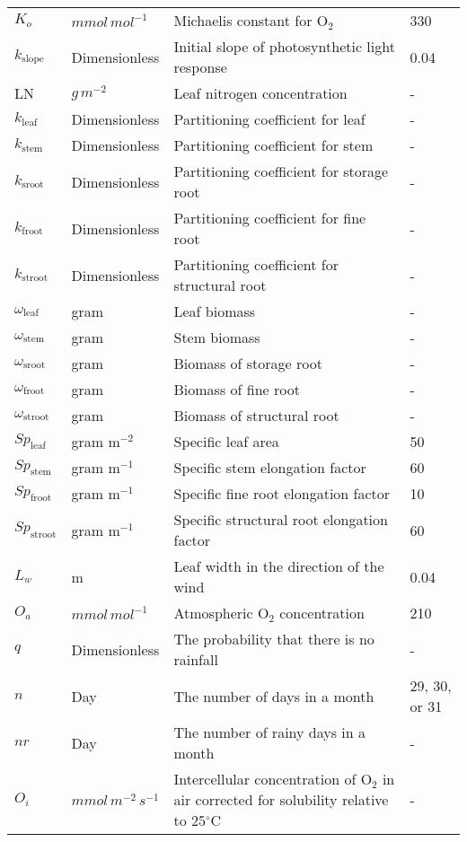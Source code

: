 \documentclass[12pt,fullpage]{report}
\begin{document}
\begin{center}
\begin{longtable}{l l p{3in} p{0.5in}}
$K_{o}$	&	$mmol\, mol^{-1}$	&	Michaelis constant for O$_{2}$ 	&	330	\\
$k_{\text{slope}}$	&	Dimensionless	&	Initial slope of photosynthetic light response	&	0.04	\\
LN	&	$g\, m^{-2}$ 	&	Leaf nitrogen concentration	&	-	\\
$k_{\text{leaf}}$	&	Dimensionless	&	Partitioning coefficient for leaf	&	-	\\
$k_{\text{stem}}$	&	Dimensionless	&	Partitioning coefficient for stem	&	-	\\
$k_{\text{sroot}}$	&	Dimensionless	&	Partitioning coefficient for storage root	&	-	\\
$k_{\text{froot}}$	&	Dimensionless	&	Partitioning coefficient for fine root	&	-	\\
$k_{\text{stroot}}$	&	Dimensionless	&	Partitioning coefficient for structural root	&	-	\\
$\omega_{\text{leaf}}$	&	gram	&	Leaf biomass	&	-	\\
$\omega_{\text{stem}}$	&	gram	&	Stem biomass	&	-	\\
$\omega_{\text{sroot}}$	&	gram	&	Biomass of storage root	&	-	\\
$\omega_{\text{froot}}$	&	gram	&	Biomass of fine root	&	-	\\
$\omega_{\text{stroot}}$	&	gram	&	Biomass of structural root	&	-	\\
$Sp_{\text{leaf}}$	&	gram m$^{-2}$ 	&	Specific leaf area	&	50	\\
$Sp_{\text{stem}}$	&	gram m$^{-1}$ 	&	Specific stem elongation factor	&	60	\\
$Sp_{\text{froot}}$	&	gram m$^{-1}$	&	Specific fine root elongation factor	&	10	\\
$Sp_{\text{stroot}}$	&	gram m$^{-1}$	&	Specific structural root elongation factor	&	60	\\
$L_w$	&	m	&	Leaf width in the direction of the wind	&	0.04	\\
$O_a$	&	$mmol\, mol^{-1}$	&	Atmospheric O$_2$ concentration	&	210	\\
$q$	&	Dimensionless	&	The probability that there is no rainfall	&	-	\\
$n$	&	Day	&	The number of days in a month	&	29, 30, or 31	\\
$nr$	&	Day 	&	The number of rainy days in a month	&	-	\\
$O_i$	&	$mmol\, m^{-2}\,s^{-1}$	&	Intercellular concentration of O$_2$ in air corrected for solubility relative to 25$^\circ$C	&	-	\\

\end{longtable}
\end{center}
\end{document}
